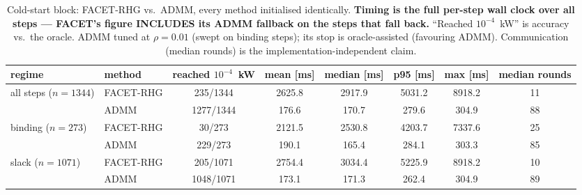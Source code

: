 \begin{table}[H]\centering\small
\begin{tabular}{llcccccc}
\toprule
regime & method & reached $10^{-4}$~kW & mean [ms] & median [ms] & p95 [ms] & max [ms] & median rounds\\
\midrule
\multirow{2}{*}{all steps ($n{=}1344$)} & FACET-RHG & 235/1344 & 2625.8 & 2917.9 & 5031.2 & 8918.2 & 11\\
 & ADMM & 1277/1344 & 176.6 & 170.7 & 279.6 & 304.9 & 88\\
\midrule
\multirow{2}{*}{binding ($n{=}273$)} & FACET-RHG & 30/273 & 2121.5 & 2530.8 & 4203.7 & 7337.6 & 25\\
 & ADMM & 229/273 & 190.1 & 165.4 & 284.1 & 303.3 & 85\\
\midrule
\multirow{2}{*}{slack ($n{=}1071$)} & FACET-RHG & 205/1071 & 2754.4 & 3034.4 & 5225.9 & 8918.2 & 10\\
 & ADMM & 1048/1071 & 173.1 & 171.3 & 262.4 & 304.9 & 89\\
\midrule
\bottomrule
\end{tabular}
\caption{Cold-start block: FACET-RHG vs.\ ADMM, every method initialised identically. \textbf{Timing is the full per-step wall clock over all steps --- FACET's figure INCLUDES its ADMM fallback on the steps that fall back.} ``Reached $10^{-4}$~kW'' is accuracy vs.\ the oracle. ADMM tuned at $\rho=0.01$ (swept on binding steps); its stop is oracle-assisted (favouring ADMM). Communication (median rounds) is the implementation-independent claim.}
\label{tab:bench-cold}
\end{table}
